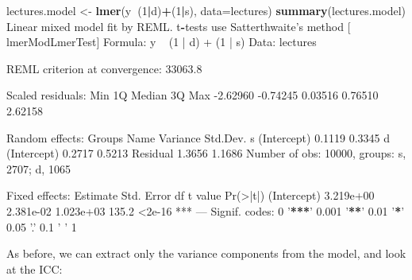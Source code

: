 \documentclass[]{article}
\newenvironment{Shaded}{\begin{snugshade}}{\end{snugshade}}
\newcommand{\CommentTok}[1]{\textcolor[rgb]{0.56,0.35,0.01}{\textit{#1}}}
\newcommand{\DataTypeTok}[1]{\textcolor[rgb]{0.13,0.29,0.53}{#1}}
\newcommand{\DecValTok}[1]{\textcolor[rgb]{0.00,0.00,0.81}{#1}}
\newcommand{\ErrorTok}[1]{\textcolor[rgb]{0.64,0.00,0.00}{\textbf{#1}}}
\newcommand{\FloatTok}[1]{\textcolor[rgb]{0.00,0.00,0.81}{#1}}
\newcommand{\KeywordTok}[1]{\textcolor[rgb]{0.13,0.29,0.53}{\textbf{#1}}}
\newcommand{\NormalTok}[1]{#1}
\newcommand{\OperatorTok}[1]{\textcolor[rgb]{0.81,0.36,0.00}{\textbf{#1}}}
\newcommand{\StringTok}[1]{\textcolor[rgb]{0.31,0.60,0.02}{#1}}
\begin{document}
\begin{Shaded}
\begin{Highlighting}[]
\NormalTok{lectures.model <-}\StringTok{ }\KeywordTok{lmer}\NormalTok{(y}\OperatorTok{~}\NormalTok{(}\DecValTok{1}\OperatorTok{|}\NormalTok{d)}\OperatorTok{+}\NormalTok{(}\DecValTok{1}\OperatorTok{|}\NormalTok{s), }\DataTypeTok{data=}\NormalTok{lectures)}
\KeywordTok{summary}\NormalTok{(lectures.model)}
\NormalTok{Linear mixed model fit by REML. t}\OperatorTok{-}\NormalTok{tests use Satterthwaite}\StringTok{'s method [}
\StringTok{lmerModLmerTest]}
\StringTok{Formula: y ~ (1 | d) + (1 | s)}
\StringTok{   Data: lectures}

\StringTok{REML criterion at convergence: 33063.8}

\StringTok{Scaled residuals: }
\StringTok{     Min       1Q   Median       3Q      Max }
\StringTok{-2.62960 -0.74245  0.03516  0.76510  2.62158 }

\StringTok{Random effects:}
\StringTok{ Groups   Name        Variance Std.Dev.}
\StringTok{ s        (Intercept) 0.1119   0.3345  }
\StringTok{ d        (Intercept) 0.2717   0.5213  }
\StringTok{ Residual             1.3656   1.1686  }
\StringTok{Number of obs: 10000, groups:  s, 2707; d, 1065}

\StringTok{Fixed effects:}
\StringTok{             Estimate Std. Error        df t value Pr(>|t|)    }
\StringTok{(Intercept) 3.219e+00  2.381e-02 1.023e+03   135.2   <2e-16 ***}
\StringTok{---}
\StringTok{Signif. codes:  0 '}\OperatorTok{**}\ErrorTok{*}\StringTok{' 0.001 '}\OperatorTok{**}\StringTok{' 0.01 '}\OperatorTok{*}\StringTok{' 0.05 '}\NormalTok{.}\StringTok{' 0.1 '} \StringTok{' 1}
\end{Highlighting}
\end{Shaded}

As before, we can extract only the variance components from the model, and look
at the ICC:

\begin{Shaded}
\end{Shaded}
\end{document}
